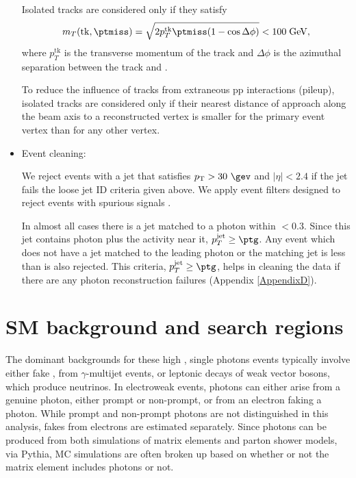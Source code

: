 \begin{itemize}
  Isolated tracks are considered only if they satisfy
  \begin{equation}\label{eq:mt_isotk}
    m_{T}(\mathrm{tk},\ptmiss) = \sqrt{2p_{T}^{\mathrm{tk}}\ptmiss(1-\cos\Delta\phi)}<100\;\mathrm{GeV},
  \end{equation}
  where $p_{T}^{\mathrm{tk}}$ is the transverse momentum of the track and
  $\Delta\phi$ is the azimuthal separation between the track and \ptvecmiss.

  To reduce the influence of tracks from extraneous pp interactions (pileup),
  isolated tracks are considered only if their nearest distance of approach
  along the beam axis to a reconstructed vertex
  is smaller for the primary event vertex than for any other vertex.

\item Event cleaning:

  We reject events with a jet that satisfies $\pt>30\ \gev$ and
  $|\eta|<2.4$ if the jet fails the loose jet ID criteria given above.
  We apply event filters designed to reject events with
  spurious \ptmiss signals \cite{CMS-PAS-JME-16-004}. 
  
  In almost all cases
  there is a jet matched to a photon within \dR $<0.3$.
  Since this jet contains photon plus the activity near it, $p_{T}^{\mathrm{jet}} \geq \ptg $.
  Any event which does not have a jet matched to the leading photon or the matching jet \pt
  is less than \ptg is also rejected. This criteria,  $p_{T}^{\mathrm{jet}} \geq \ptg $,
  helps in cleaning the data if there are any photon reconstruction failures (Appendix \ref{AppendixD}).
\end{itemize}

\section{SM background and search regions}
The dominant backgrounds for these high \ptmiss, single photons events typically involve either fake \ptmiss, from $\gamma$-multijet events, or leptonic 
decays of weak vector bosons, which produce neutrinos.  In electroweak events, photons can either arise from a genuine photon,
either prompt or non-prompt, or from an electron faking a photon.  While prompt and non-prompt photons are not distinguished
in this analysis, fakes from electrons are estimated separately.  Since photons can be produced from both simulations of
matrix elements and parton shower models, via Pythia, MC simulations are often broken up based on whether or not the matrix 
element includes photons or not. 

